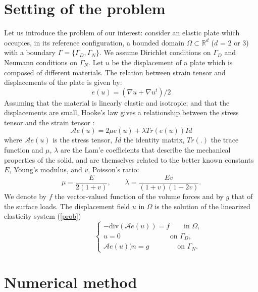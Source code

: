 \documentclass[notitlepage,a4paper,fleqn,9pt]{icmfarticle}
\begin{document}
\begin{multicols}{2}
\section{Setting of the problem} 
\label{sec:model}
Let us introduce the problem of our interest: consider an elastic plate which occupies, in its reference configuration, a bounded domain $\Omega \subset \mathbb{R}^d$ ($d$ = 2 or 3) with a boundary $\Gamma = \{\Gamma_D, \Gamma_N\}$. We assume Dirichlet conditions on $\Gamma_D$ and Neumann conditions on $\Gamma_N$. 
Let $u$ be the displacement of a plate which is composed of different materials. The relation between strain tensor and displacements of the plate is given by:
$$e(u) = (\nabla u + \nabla u^t)/2$$
Assuming that the material is linearly elastic and isotropic; and that the displacements are small, Hooke's law gives a relationship between the stress tensor and the strain tensor :
$$\mathcal{A}e(u) = 2\mu e(u) + \lambda Tr(e(u))Id$$
where $\mathcal{A}e(u)$ is the stress tensor, $Id$ the identity matrix, $Tr(.)$ the trace function and $\mu$, $\lambda$ are the Lam'e coefficients that describe the mechanical properties of the solid, and are themselves related to the better known constants $E$, Young's modulus, and $v$, Poisson's ratio:
$$\mu = \frac{E}{2(1 + v)}, \qquad \lambda = \frac{Ev}{(1 + v)(1 - 2v)}.$$
We denote by $f$ the vector-valued function of the volume forces and by $g$ that of the surface loads. The displacement field $u$ in $\Omega$ is the solution of the linearized elasticity system (\ref{prob})
\begin{equation}\label{prob}
\quad\quad\quad\quad\quad
\begin{cases}
-\text{div}(\mathcal{A}e(u)) = f \qquad \text{in } \Omega,\\
u = 0 \quad\qquad\qquad\qquad \text{on } \Gamma_D, \\
\mathcal{A}e(u))n = g \qquad\qquad \text{on } \Gamma_N.
\end{cases}
\end{equation}

\section{Numerical method}
\label{sec:method}

\end{multicols}
\end{document}

